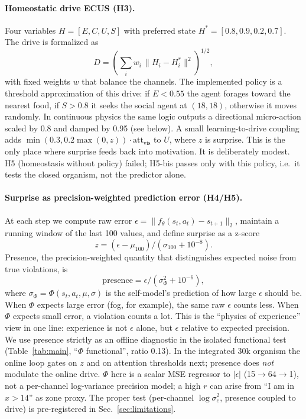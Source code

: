 \documentclass[11pt,a4paper]{article}
\begin{document}
\paragraph{Homeostatic drive ECUS (H3).} Four variables $H=[E, C, U, S]$ with preferred state $H^*=[0.8, 0.9, 0.2, 0.7]$. The drive is formalized as
\begin{equation}
D = \left(\sum_i w_i \, \|H_i - H^*_i\|^2 \right)^{1/2},
\end{equation}
with fixed weights $w$ that balance the channels. The implemented policy is a threshold approximation of this drive: if $E < 0.55$ the agent forages toward the nearest food, if $S > 0.8$ it seeks the social agent at $(18,18)$, otherwise it moves randomly. In continuous physics the same logic outputs a directional micro-action scaled by 0.8 and damped by 0.95 (see below). A small learning-to-drive coupling adds $\min(0.3, 0.2\max(0,z)) \cdot \mathrm{att}_{\mathrm{vis}}$ to $U$, where $z$ is surprise. This is the only place where surprise feeds back into motivation. It is deliberately modest. H5 (homeostasis without policy) failed; H5-bis passes only with this policy, i.e.\ it tests the closed organism, not the predictor alone.

\paragraph{Surprise as precision-weighted prediction error (H4/H5).} At each step we compute raw error $\epsilon = \|f_\theta(s_t,a_t) - s_{t+1}\|_2$, maintain a running window of the last 100 values, and define surprise as a z-score
\begin{equation}
z = (\epsilon - \mu_{100}) / (\sigma_{100}+10^{-8}).
\end{equation}
Presence, the precision-weighted quantity that distinguishes expected noise from true violations, is
\begin{equation}
\mathrm{presence} = \epsilon / (\sigma_\Phi^2 + 10^{-6}),
\end{equation}
where $\sigma_\Phi = \Phi(s_t, a_t, \mu, \sigma)$ is the self-model's prediction of how large $\epsilon$ should be. When $\Phi$ expects large error (fog, for example), the same raw $\epsilon$ counts less. When $\Phi$ expects small error, a violation counts a lot. This is the ``physics of experience'' view in one line: experience is not $\epsilon$ alone, but $\epsilon$ relative to expected precision. We use presence strictly as an offline diagnostic in the isolated functional test (Table~\ref{tab:main}, ``$\Phi$ functional'', ratio 0.13). In the integrated 30k organism the online loop gates on $z$ and on attention thresholds next; presence does \textit{not} modulate the online drive. $\Phi$ here is a scalar MSE regressor to $|\epsilon|$ (15$\rightarrow$64$\rightarrow$1), not a per-channel log-variance precision model; a high $r$ can arise from ``I am in $x>14$'' as zone proxy. The proper test (per-channel $\log \sigma^2_c$, presence coupled to drive) is pre-registered in Sec.~\ref{sec:limitations}.
\end{document}
